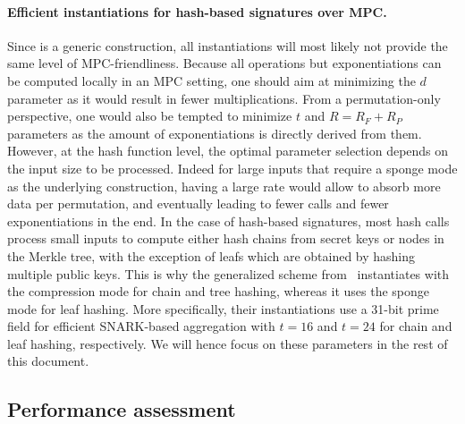 \paragraph{Efficient instantiations for hash-based signatures over MPC.}
Since \PoseidonTwo is a generic construction, all instantiations will most likely not provide the same level of MPC-friendliness.
Because all operations but exponentiations can be computed locally in an MPC setting, one should aim at minimizing the $d$ parameter as it would result in fewer multiplications.
From a permutation-only perspective, one would also be tempted to minimize $t$ and $R = R_F + R_P$ parameters  as the amount of exponentiations is directly derived from them.
However, at the hash function level, the optimal parameter selection depends on the input size to be processed. Indeed for large inputs that require a sponge mode as the underlying construction, having a large rate would allow to absorb more data per permutation, and eventually leading to fewer calls and fewer exponentiations in the end.
In the case of hash-based signatures, most hash calls process small inputs to compute either hash chains from secret keys or nodes in the Merkle tree, with the exception of leafs which are obtained by hashing multiple public keys.
This is why the generalized \XMSS scheme from~\cite{cryptoeprint:2025/055} instantiates \PoseidonTwo with the compression mode for chain and tree hashing, whereas it uses the sponge mode for leaf hashing.
More specifically, their instantiations use a 31-bit prime field for efficient SNARK-based aggregation with $t = 16$ and $t = 24$ for chain and leaf hashing, respectively.
We will hence focus on these parameters in the rest of this document.

\subsection{Performance assessment}
